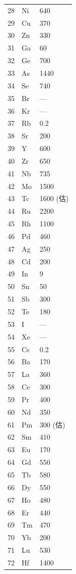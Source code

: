 \documentclass[12pt,a4paper]{article}
\begin{document}
\begin{longtable}{p{0.6cm}p{1.2cm}p{2.5cm}}
		28 & Ni & 640 \\
		29 & Cu & 370 \\
		30 & Zn & 330 \\
		31 & Ga & 60 \\
		32 & Ge & 700 \\
		33 & As & 1440 \\
		34 & Se & 740 \\
		35 & Br & — \\
		36 & Kr & — \\
		37 & Rb & 0.2 \\
		38 & Sr & 200 \\
		39 & Y  & 600 \\
		40 & Zr & 650 \\
		41 & Nb & 735 \\
		42 & Mo & 1500 \\
		43 & Tc & 1600 (估) \\
		44 & Ru & 2200 \\
		45 & Rh & 1100 \\
		46 & Pd & 460 \\
		47 & Ag & 250 \\
		48 & Cd & 200 \\
		49 & In & 9 \\
		50 & Sn & 50 \\
		51 & Sb & 300 \\
		52 & Te & 180 \\
		53 & I  & — \\
		54 & Xe & — \\
		55 & Cs & 0.2 \\
		56 & Ba & 170 \\
		57 & La & 360 \\
		58 & Ce & 300 \\
		59 & Pr & 400 \\
		60 & Nd & 350 \\
		61 & Pm & 300 (估) \\
		62 & Sm & 410 \\
		63 & Eu & 170 \\
		64 & Gd & 550 \\
		65 & Tb & 580 \\
		66 & Dy & 550 \\
		67 & Ho & 480 \\
		68 & Er & 440 \\
		69 & Tm & 470 \\
		70 & Yb & 200 \\
		71 & Lu & 530 \\
		72 & Hf & 1400 \\

\end{longtable}
\end{document}
